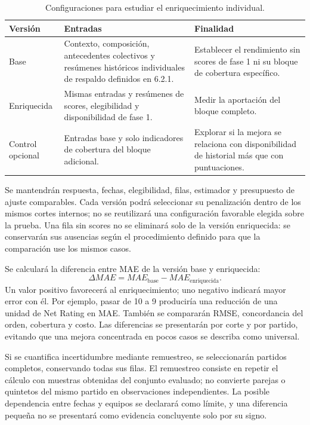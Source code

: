\begin{table}[htbp]
\centering\small
\caption{Configuraciones para estudiar el enriquecimiento individual.}
\label{tab:ablacion-fase2}
\begin{tabularx}{\textwidth}{@{}p{2.2cm}XX@{}}
\toprule
\textbf{Versión}&\textbf{Entradas}&\textbf{Finalidad}\\\midrule
Base & Contexto, composición, antecedentes colectivos y resúmenes históricos individuales de respaldo definidos en 6.2.1. & Establecer el rendimiento sin scores de fase 1 ni su bloque de cobertura específico.\\
Enriquecida & Mismas entradas y resúmenes de scores, elegibilidad y disponibilidad de fase 1. & Medir la aportación del bloque completo.\\
Control opcional & Entradas base y solo indicadores de cobertura del bloque adicional. & Explorar si la mejora se relaciona con disponibilidad de historial más que con puntuaciones.\\
\bottomrule
\end{tabularx}
\end{table}

Se mantendrán respuesta, fechas, elegibilidad, filas, estimador y presupuesto de ajuste comparables. Cada versión podrá seleccionar su penalización dentro de los mismos cortes internos; no se reutilizará una configuración favorable elegida sobre la prueba. Una fila sin scores no se eliminará solo de la versión enriquecida: se conservarán sus ausencias según el procedimiento definido para que la comparación use los mismos casos.

Se calculará la diferencia entre MAE de la versión base y enriquecida:
\[
 \Delta MAE=MAE_{\mathrm{base}}-MAE_{\mathrm{enriquecida}}.
\]
Un valor positivo favorecerá al enriquecimiento; uno negativo indicará mayor error con él. Por ejemplo, pasar de 10 a 9 produciría una reducción de una unidad de Net Rating en MAE. También se compararán RMSE, concordancia del orden, cobertura y costo. Las diferencias se presentarán por corte y por partido, evitando que una mejora concentrada en pocos casos se describa como universal.

Si se cuantifica incertidumbre mediante remuestreo, se seleccionarán partidos completos, conservando todas sus filas. El remuestreo consiste en repetir el cálculo con muestras obtenidas del conjunto evaluado; no convierte parejas o quintetos del mismo partido en observaciones independientes. La posible dependencia entre fechas y equipos se declarará como límite, y una diferencia pequeña no se presentará como evidencia concluyente solo por su signo.

